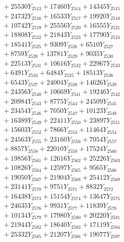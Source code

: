 \documentclass[a4paper,10pt]{article}
\begin{document}
{\begin{align}
&\;  + 25530 Y_{2513} + 17460 Y_{2514} + 14345 Y_{2515} \\[0.3ex]
&\;  + 24732 Y_{2516} + 16533 Y_{2517} + 19920 Y_{2518} \\[0.5ex]\allowbreak
&\;  + 10742 Y_{2519} + 25556 Y_{2520} + 16555 Y_{2521} \\[0.3ex]
&\;  + 18808 Y_{2522} + 21843 Y_{2523} + 17790 Y_{2524} \\[0.3ex]
&\;  + 18541 Y_{2525} + 9309 Y_{2526} + 6510 Y_{2527} \\[0.3ex]
&\;  + 8759 Y_{2528} + 13781 Y_{2529} + 9035 Y_{2530} \\[0.3ex]
&\;  + 22513 Y_{2531} + 10616 Y_{2532} + 22967 Y_{2533} \\[0.3ex]
&\;  + 6491 Y_{2534} + 6484 Y_{2535} + 18513 Y_{2536} \\[0.3ex]
&\;  + 6543 Y_{2537} + 24004 Y_{2538} + 14626 Y_{2539} \\[0.3ex]
&\;  + 24356 Y_{2540} + 10669 Y_{2541} + 19246 Y_{2542} \\[0.3ex]
&\;  + 20984 Y_{2543} + 8775 Y_{2544} + 24509 Y_{2545} \\[0.3ex]
&\;  + 23454 Y_{2546} + 7050 Y_{2547} + 10123 Y_{2548} \\[0.5ex]\allowbreak
&\;  + 16389 Y_{2549} + 22411 Y_{2550} + 23897 Y_{2551} \\[0.3ex]
&\;  + 15603 Y_{2552} + 7866 Y_{2553} + 11464 Y_{2554} \\[0.3ex]
&\;  + 24563 Y_{2555} + 23160 Y_{2556} + 7054 Y_{2557} \\[0.3ex]
&\;  + 8857 Y_{2558} + 22010 Y_{2559} + 17524 Y_{2560} \\[0.3ex]
&\;  + 19856 Y_{2561} + 12616 Y_{2562} + 25226 Y_{2563} \\[0.3ex]
&\;  + 10826 Y_{2564} + 12597 Y_{2565} + 9565 Y_{2566} \\[0.3ex]
&\;  + 19050 Y_{2567} + 21904 Y_{2568} + 25412 Y_{2569} \\[0.3ex]
&\;  + 23141 Y_{2570} + 9751 Y_{2571} + 8832 Y_{2572} \\[0.3ex]
&\;  + 16438 Y_{2573} + 15154 Y_{2574} + 13647 Y_{2575} \\[0.3ex]
&\;  + 24635 Y_{2576} + 9931 Y_{2577} + 11839 Y_{2578} \\[0.5ex]\allowbreak
&\;  + 10134 Y_{2579} + 17980 Y_{2580} + 20220 Y_{2581} \\[0.3ex]
&\;  + 21944 Y_{2582} + 18640 Y_{2583} + 17119 Y_{2584} \\[0.3ex]
&\;  + 25332 Y_{2585} + 21207 Y_{2586} + 19077 Y_{2587} \\[0.3ex]

\end{align}}
\end{document}

